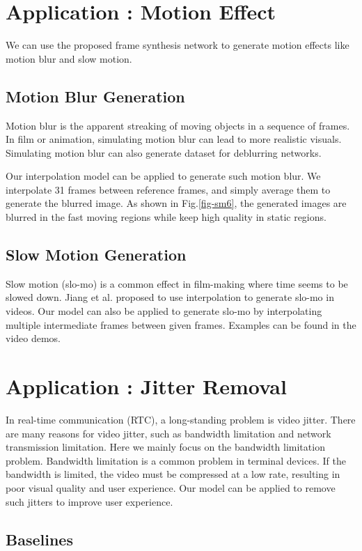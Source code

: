 \documentclass[sigconf]{acmart}
\begin{document}
\section{Application : Motion Effect}
We can use the proposed frame synthesis network to generate 
motion effects like motion blur and slow motion.

\subsection{Motion Blur Generation}
Motion blur is the apparent streaking of moving objects in a sequence of frames. In film or animation, simulating motion blur can lead to more realistic visuals. Simulating motion blur can also generate dataset for deblurring networks. 

Our interpolation model can be applied to generate such motion blur. We interpolate 31 frames between reference frames, and simply average them to generate the blurred image. As shown in Fig.\ref{fig-sm6}, the generated images are blurred in the fast moving regions while keep high quality in static regions.

\subsection{Slow Motion Generation}
Slow motion (slo-mo) is a common effect in film-making where time seems to be slowed down. Jiang et al. \cite{jiang2018super} proposed to use interpolation to generate slo-mo in videos. Our model can also be applied to generate slo-mo by interpolating multiple intermediate frames between given frames. Examples can be found in the video demos.



\section{Application : Jitter Removal}

In real-time communication (RTC), a long-standing problem is video jitter. There are many reasons for video jitter, such as bandwidth limitation and network transmission limitation. Here we mainly focus on the bandwidth limitation problem. Bandwidth limitation is a common problem in terminal devices. If the bandwidth is limited, the video must be compressed at a low rate, resulting in poor visual quality and user experience. Our model can be applied to remove such jitters to improve user experience.


\subsection{Baselines}
\end{document}
